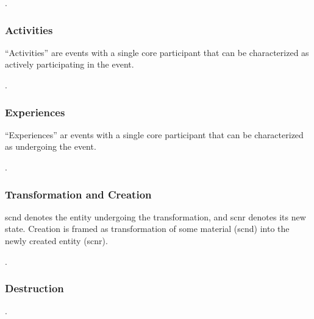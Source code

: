 \documentclass[a4paper]{article}
\begin{document}
\ex. 

\subsubsection{Activities}

``Activities'' are events with a single core participant that can be
characterized as actively participating in the event.

\ex. 

\subsubsection{Experiences}

``Experiences'' ar events with a single core participant that can be
characterized as undergoing the event.

\ex. 

\subsubsection{Transformation and Creation}

\textsf{scnd} denotes the entity undergoing the transformation, and
\textsf{scnr} denotes its new state. Creation is framed as transformation of
some material (\textsf{scnd}) into the newly created entity (\textsf{scnr}).

\ex. 

\subsubsection{Destruction}

\ex. 

%
%
\end{document}
